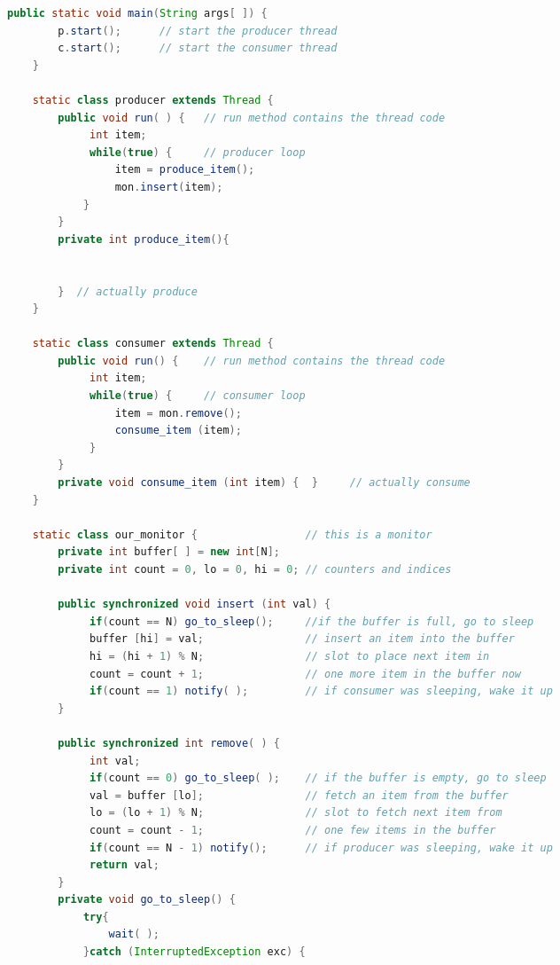 \documentclass{article}
\begin{document}
\begin{CJK}{UTF8}{gbsn}
\begin{lstlisting}[language=java]
    public static void main(String args[ ]) {  
        p.start();      // start the producer thread  
        c.start();      // start the consumer thread  
    }  
   
    static class producer extends Thread {  
        public void run( ) {   // run method contains the thread code  
             int item;  
             while(true) {     // producer loop  
                 item = produce_item();  
                 mon.insert(item);  
            }  
        }  
        private int produce_item(){  
              
              
        }  // actually produce  
    }  
   
    static class consumer extends Thread {  
        public void run() {    // run method contains the thread code  
             int item;  
             while(true) {     // consumer loop  
                 item = mon.remove();  
                 consume_item (item);  
             }  
        }  
        private void consume_item (int item) {  }     // actually consume  
    }  
   
    static class our_monitor {                 // this is a monitor  
        private int buffer[ ] = new int[N];  
        private int count = 0, lo = 0, hi = 0; // counters and indices  
   
        public synchronized void insert (int val) {  
             if(count == N) go_to_sleep();     //if the buffer is full, go to sleep  
             buffer [hi] = val;                // insert an item into the buffer  
             hi = (hi + 1) % N;                // slot to place next item in  
             count = count + 1;                // one more item in the buffer now  
             if(count == 1) notify( );         // if consumer was sleeping, wake it up  
        }  
   
        public synchronized int remove( ) {  
             int val;  
             if(count == 0) go_to_sleep( );    // if the buffer is empty, go to sleep  
             val = buffer [lo];                // fetch an item from the buffer  
             lo = (lo + 1) % N;                // slot to fetch next item from  
             count = count - 1;                // one few items in the buffer  
             if(count == N - 1) notify();      // if producer was sleeping, wake it up  
             return val;  
        }  
        private void go_to_sleep() {   
            try{  
                wait( );  
            }catch (InterruptedException exc) {  
                  

\end{lstlisting}
\end{CJK}
\end{document}
